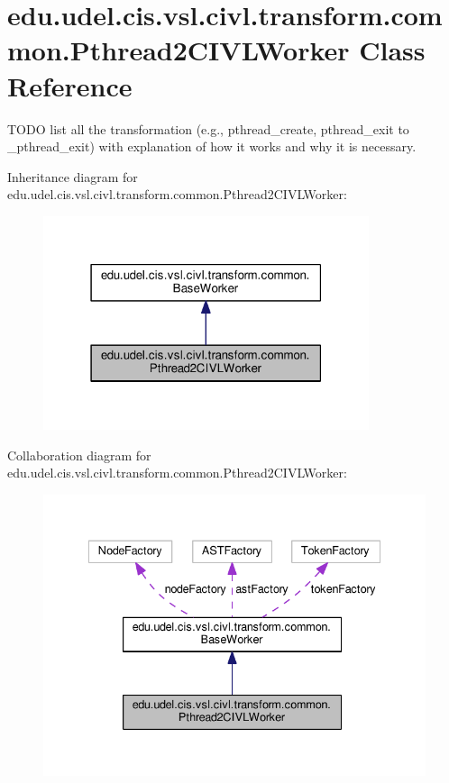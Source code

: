 \hypertarget{classedu_1_1udel_1_1cis_1_1vsl_1_1civl_1_1transform_1_1common_1_1Pthread2CIVLWorker}{}\section{edu.\+udel.\+cis.\+vsl.\+civl.\+transform.\+common.\+Pthread2\+C\+I\+V\+L\+Worker Class Reference}
\label{classedu_1_1udel_1_1cis_1_1vsl_1_1civl_1_1transform_1_1common_1_1Pthread2CIVLWorker}


T\+O\+D\+O list all the transformation (e.\+g., pthread\+\_\+create, pthread\+\_\+exit to \+\_\+pthread\+\_\+exit) with explanation of how it works and why it is necessary.  




Inheritance diagram for edu.\+udel.\+cis.\+vsl.\+civl.\+transform.\+common.\+Pthread2\+C\+I\+V\+L\+Worker\+:
\nopagebreak
\begin{figure}[H]
\begin{center}
\leavevmode
\includegraphics[width=271pt]{classedu_1_1udel_1_1cis_1_1vsl_1_1civl_1_1transform_1_1common_1_1Pthread2CIVLWorker__inherit__graph}
\end{center}
\end{figure}


Collaboration diagram for edu.\+udel.\+cis.\+vsl.\+civl.\+transform.\+common.\+Pthread2\+C\+I\+V\+L\+Worker\+:
\nopagebreak
\begin{figure}[H]
\begin{center}
\leavevmode
\includegraphics[width=335pt]{classedu_1_1udel_1_1cis_1_1vsl_1_1civl_1_1transform_1_1common_1_1Pthread2CIVLWorker__coll__graph}
\end{center}
\end{figure}
